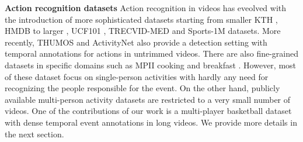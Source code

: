 \noindent \textbf{Action recognition datasets}
Action recognition in videos has eveolved with the introduction of more
sophisticated datasets starting from smaller KTH \cite{KTH}, HMDB \cite{HMDB}
to larger , UCF101 \cite{UCF101}, TRECVID-MED \cite{MED11} and Sports-1M \cite{Karpathy_CVPR14}
datasets.
More recently, THUMOS \cite{THUMOS} and ActivityNet \cite{ActivityNet} also provide a detection
setting with temporal annotations for actions in untrimmed videos.
There are also fine-grained datasets
in specific domains such as MPII cooking \cite{Finegrained_cooking} and breakfast \cite{Breakfast}.
However, most of these dataset focus on single-person activities with hardly
any need for recognizing the people responsible for the event. On the other
hand, publicly available multi-person activity datasets \cite{Choi_ICCV09,Ryoo_10} are restricted
to a very small number of videos.  One of the contributions of our work is 
a multi-player basketball dataset with dense temporal event annotations in
long videos. We provide more details in the next section.
